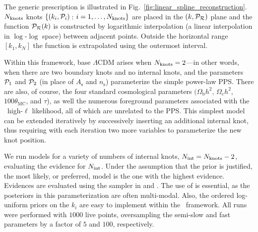 The generic prescription is illustrated in Fig.~\ref{fig:linear_spline_reconstruction}. \(\Nknots\) knots
\(\{(k_i,\mathcal{P}_{i})\,\): \(i=1,\ldots,N_\mathrm{knots}\}\) are placed in the \((k,\mathcal{P}_\mathcal{R})\) plane and the function \(\mathcal{P}_\mathcal{R}(k)\) is
constructed by logarithmic interpolation (a linear interpolation in \(\log\)-\(\log\) space) between adjacent points.
Outside the horizontal range \([k_1,k_N]\) the function is extrapolated using the outermost interval.

Within this framework, base \(\Lambda\)CDM arises when \({N_\mathrm{knots}=2}\)---in other words, when there are two boundary knots
and no internal knots, and the parameters \(\mathcal{P}_{1}\) and \(\mathcal{P}_{2}\) (in place of \(A_\mathrm{s}\) and \(n_\mathrm{s}\)) parameterize
the simple power-law PPS\@. There are also, of course,
the four standard cosmological parameters \((\Omega_{\mathrm{b}} h^2\), \(\Omega_{\mathrm{c}} h^2\), \(100\theta_{\mathrm{MC}}\), and 
\(\tau\)), as well the numerous foreground parameters associated with the \Planck\ high-\(\ell\) likelihood, all of which are unrelated to the PPS\@.
This simplest model can be extended iteratively by successively inserting an additional internal knot, thus requiring with each iteration
two more variables to parameterize the new knot position.


\begin{table}[tp]
  \centering
  
  \caption{%
    Prior for moveable knot positions.
    The \(\PR\) positions are distributed in a log-uniform manner across a wide range.
    The \(k\) positions are also log-uniformly distributed
    across the entire range needed by \CosmoMC{} and are sorted so that \({k_1<\cdots<k_{\Nknots}}\). 
    When we marginalize over the number of knots, \(\Nknots\), we assume a uniform prior between 2 and 10.\label{tab:P_k_priors}  }                          %
\end{table}                        %

We run models for a variety of numbers of internal knots, \(N_\mathrm{int} =N_\mathrm{knots} -2\), evaluating the evidence for \(N_\mathrm{int}\).
Under the assumption that the prior is justified, the most likely, or preferred, model is the one with the highest
evidence.  Evidences are evaluated using the \PolyChord{} sampler \citep{polychordletter,polychordpaper} 
in \CAMB{} and \CosmoMC{}. The use of \PolyChord{} is
essential, as the posteriors in this parameterization are often multi-modal. Also, the ordered log-uniform priors on
the \(k_i\) are easy to implement within the \PolyChord\ framework. All runs were performed with \(1000\) live points, 
oversampling the semi-slow and fast parameters by a factor of \(5\) and \(100\), respectively.

